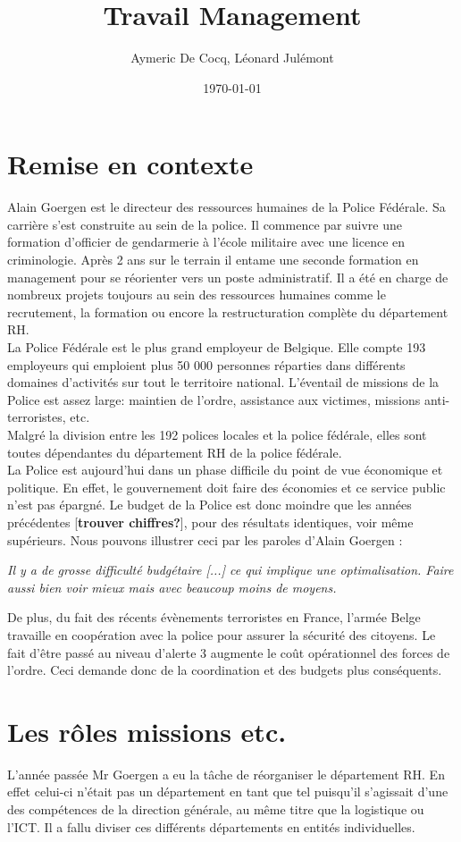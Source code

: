 \documentclass[12pt]{article}
\title{Travail Management}
\author{Aymeric De Cocq, Léonard Julémont}
\date{\today}
\begin{document}
\section{Remise en contexte}


Alain Goergen est le directeur des ressources humaines de la Police Fédérale. Sa carrière s'est construite au sein de la police. Il commence par suivre une formation d'officier de gendarmerie à l'école militaire avec une licence en criminologie. Après 2 ans sur le terrain il entame une seconde formation en management pour se réorienter vers un poste administratif. Il a été en charge de nombreux projets toujours au sein des ressources humaines comme le recrutement, la formation ou encore la restructuration complète du département RH.\\

La Police Fédérale est le plus grand employeur de Belgique. Elle compte 193 employeurs qui emploient plus 50 000 personnes réparties dans différents domaines d'activités sur tout le territoire national. L'éventail de missions de la Police est assez large: maintien de l'ordre, assistance aux victimes, missions anti-terroristes, etc.\\
Malgré la division entre les 192 polices locales et la police fédérale, elles sont toutes dépendantes du département RH de la police fédérale.\\
 
La Police est aujourd'hui dans un phase difficile du point de vue économique et politique. En effet, le gouvernement doit faire des économies et ce service public n'est pas épargné. Le budget de la Police est donc moindre que les années précédentes [\textbf{trouver chiffres?}], pour des résultats identiques, voir même supérieurs. Nous pouvons illustrer ceci par les paroles d'Alain Goergen : 

\begin{center}
	\textit{Il y a de grosse difficulté budgétaire [...] ce qui implique une optimalisation. Faire aussi bien voir mieux mais avec beaucoup moins de moyens.}
\end{center} 

De plus, du fait des récents évènements terroristes en France, l'armée Belge travaille en coopération avec la police pour assurer la sécurité des citoyens. Le fait d'être passé au niveau d'alerte 3 augmente le coût opérationnel des forces de l'ordre. Ceci demande donc de la coordination et des budgets plus conséquents.

\section{Les rôles missions etc.}
L'année passée Mr Goergen a eu la tâche de réorganiser le département RH. En effet celui-ci n'était pas un département en tant que tel puisqu'il s'agissait d'une des compétences de la direction générale, au même titre que la logistique ou l'ICT. Il a fallu diviser ces différents départements en entités individuelles.\\
\end{document}
